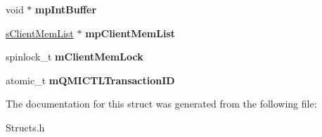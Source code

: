 \begin{DoxyCompactItemize}
\item 
\hypertarget{structsQMIDev_a7bf4e0e1b1fc18e9dd61a85afb501a98}{void $\ast$ {\bfseries mp\-Int\-Buffer}}\label{structsQMIDev_a7bf4e0e1b1fc18e9dd61a85afb501a98}

\item 
\hypertarget{structsQMIDev_ad2fd912e940be7b4d6e6229aefa26f1d}{\hyperlink{structsClientMemList}{s\-Client\-Mem\-List} $\ast$ {\bfseries mp\-Client\-Mem\-List}}\label{structsQMIDev_ad2fd912e940be7b4d6e6229aefa26f1d}

\item 
\hypertarget{structsQMIDev_af6693f4934aaf423a2fe43ef4f295556}{spinlock\-\_\-t {\bfseries m\-Client\-Mem\-Lock}}\label{structsQMIDev_af6693f4934aaf423a2fe43ef4f295556}

\item 
\hypertarget{structsQMIDev_a419352a68a2297a5946d72895249996d}{atomic\-\_\-t {\bfseries m\-Q\-M\-I\-C\-T\-L\-Transaction\-I\-D}}\label{structsQMIDev_a419352a68a2297a5946d72895249996d}

\end{DoxyCompactItemize}


\-The documentation for this struct was generated from the following file\-:\begin{DoxyCompactItemize}
\item 
\-Structs.\-h\end{DoxyCompactItemize}
